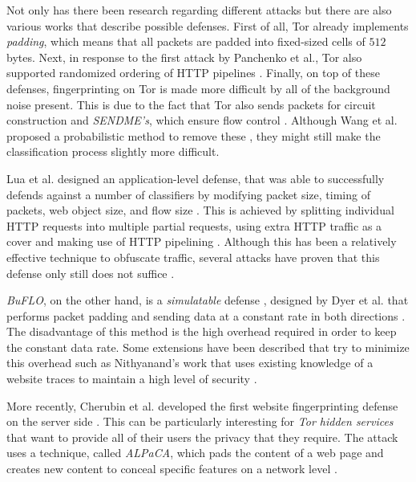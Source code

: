 Not only has there been research regarding different attacks but there are also various works that describe possible defenses.
First of all, Tor already implements \textit{padding}, which means that all packets are padded into fixed-sized cells of $512$ bytes.
Next, in response to the first attack by Panchenko et al., Tor also supported randomized ordering of HTTP pipelines \cite{panchenko1, kfingerprinting, perry2011experimental}.
Finally, on top of these defenses, fingerprinting on Tor is made more difficult by all of the background noise present.
This is due to the fact that Tor also sends packets for circuit construction and \textit{SENDME's}, which ensure flow control \cite{panchenko2}.
Although Wang et al. proposed a probabilistic method to remove these \cite{wang_goldberg_2013}, they might still make the classification process slightly more difficult.

Lua et al. designed an application-level defense, that was able to successfully defends against a number of classifiers by modifying packet size, timing of packets, web object size, and
flow size \cite{perry2011experimental}. This is achieved by splitting individual HTTP requests into multiple partial requests, using extra HTTP traffic as a cover and making use of HTTP pipelining \cite{cai_zhang_joshi_johnson_2012}.
Although this has been a relatively effective technique to obfuscate traffic, several attacks have proven that this defense only still does not suffice \cite{cai_zhang_joshi_johnson_2012,wang_cai_johnson_nithyanand_goldberg_2014}.

\textit{BuFLO}, on the other hand, is a \textit{simulatable} defense \cite{wang_cai_johnson_nithyanand_goldberg_2014}, designed by Dyer et al. that performs packet padding and sending data at a constant rate in both directions \cite{dyer2012peek}.
The disadvantage of this method is the high overhead required in order to keep the constant data rate.
Some extensions have been described that try to minimize this overhead such as  Nithyanand's work that uses existing knowledge of a website traces to maintain a high level of security \cite{nithyanand2014glove}.

More recently, Cherubin et al. developed the first website fingerprinting defense on the server side \cite{cherubin2017website}.
This can be particularly interesting for \textit{Tor hidden services} that want to provide all of their users the privacy that they require.
The attack uses a technique, called \textit{ALPaCA}, which pads the content of a web page and creates new content to conceal specific features on a network level \cite{cherubin2017website}.

